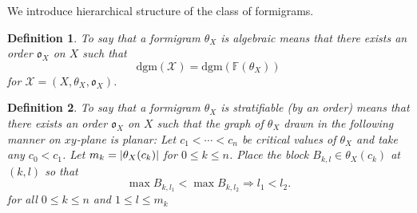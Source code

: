 \documentclass[a4paper,12pt]{article}
\newtheorem{definition}{Definition}[section]
\newcommand{\dgm}{\mathrm{dgm}}
\DeclarePairedDelimiter{\abs}{\lvert}{\rvert}
\begin{document}
We introduce hierarchical structure of the class of formigrams.

\begin{definition} To say that a formigram $\theta_X$ is algebraic means that there exists an order $\mathfrak{o}_X$ on $X$ such that $$\dgm(\mathcal{X})=\dgm(\mathbb{F}(\theta_X))$$ for $\mathcal{X}=(X,\theta_X, \mathfrak{o}_X)$.
\end{definition}

\begin{definition} \label{stratifiable}To say that a formigram $\theta_X$ is stratifiable (by an order) means that there exists an order $\mathfrak{o}_X$ on $X$ such that the graph of $\theta_X$ drawn in the following manner on $xy$-plane is planar: Let $c_1<\cdots<c_n$ be critical values of $\theta_X$ and take any $c_0<c_1$. Let $m_k=\abs{\theta_X(c_k)}$ for $0\leq k\leq n$. Place the block $B_{k,l}\in \theta_X(c_k)$ at $(k,l)$  so that $$\max B_{k,l_1}< \max B_{k,l_2} \Rightarrow l_1< l_2.$$ for all $0\leq k \leq n$ and $1 \leq l \leq m_k$
\end{definition}		
	
\end{document}

